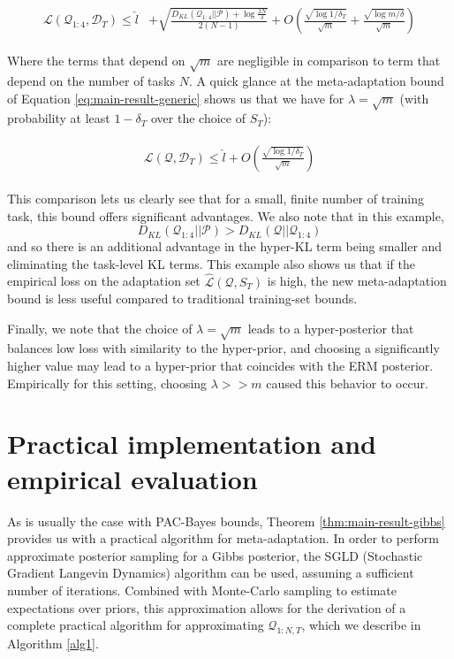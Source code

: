 \documentclass{article}
\theoremstyle{definition}
\begin{document}
\begin{align*}
\begin{split}
	\mathcal{L}(\mathcal{Q}_{1:4},\mathcal{D}_T)\leq \hat{l} &+ \sqrt{\frac{D_{KL}(\mathcal{Q}_{1:4}||\mathcal{P})+\log\frac{2N}{\delta}}{2(N-1)}}
	+O\left (\frac{\sqrt{\log{1/\delta_T}}}{\sqrt{m}}+\frac{\sqrt{\log{m/\delta}}}{\sqrt{m}}\right )
\end{split}
\end{align*}

Where the terms that depend on $\sqrt{m}$ are negligible in comparison to term that depend on the number of tasks $N$.
A quick glance at the meta-adaptation bound of Equation \ref{eq:main-result-generic} shows us that we have for $\lambda=\sqrt{m}$ (with probability at least $1-\delta_T$ over the choice of $S_T$):

\begin{align*}
\begin{split}
\mathcal{L}(\mathcal{Q},\mathcal{D}_T)\leq \hat{l} + O\left (\frac{\sqrt{\log{1/\delta_T}}}{\sqrt{m}}\right ) 
\end{split}
\end{align*}

This comparison lets us clearly see that for a small, finite number of training task, this bound offers significant advantages. We also note that in this example,  $$D_{KL}(\mathcal{Q}_{1:4}||\mathcal{P})>D_{KL}(\mathcal{Q}||\mathcal{Q}_{1:4})$$ 
and so there is an additional advantage in the hyper-KL term being smaller and eliminating the task-level KL terms. This example also shows us that if the empirical loss on the adaptation set $\hat{\mathcal{L}}(\mathcal{Q}, S_T)$ is high, the new meta-adaptation bound is less useful compared to traditional training-set bounds. 

Finally, we note that the choice of $\lambda=\sqrt{m}$ leads to a hyper-posterior that balances low loss with similarity to the hyper-prior, and choosing a significantly higher value may lead to a hyper-prior that coincides with the ERM posterior. Empirically for this setting, choosing $\lambda>>m$ caused this behavior to occur.

\section{Practical implementation and empirical evaluation}

As is usually the case with PAC-Bayes bounds, Theorem \ref{thm:main-result-gibbs} provides us with a practical algorithm for meta-adaptation. In order to perform approximate posterior sampling for a Gibbs posterior, the SGLD (Stochastic Gradient Langevin Dynamics) algorithm \citep{Welling2011} can be used, assuming a sufficient number of iterations.
Combined with Monte-Carlo sampling to estimate expectations over priors, 
this approximation allows for the derivation of a complete practical algorithm for approximating $\mathcal{Q}_{1:N,T}$, which we describe in Algorithm \ref{alg1}.
\end{document}
